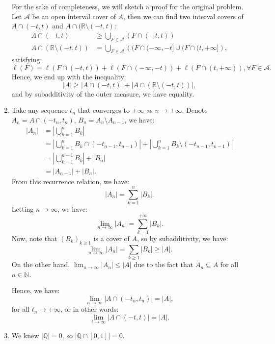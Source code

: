 \begin{enumerate}[label=\textbf{2A.\arabic*}]
    For the sake of completeness, we will sketch a proof for the original
    problem. Let \( \mathcal{A} \) be an open interval cover of \( A \), then we
    can find two interval covers of \( A \cap (-t, t) \) and \( A \cap
    (\mathbb{R} \setminus (-t, t)\):
    \begin{align*}
      A \cap (-t, t) &\ge \bigcup_{F \in \mathcal{A}} (F \cap (-t, t))\\
      A \cap (\mathbb{R} \setminus (-t, t)) &= \bigcup_{F \in \mathcal{A}} \left(
      (F \cap  (-\infty, -t] \cup 
      (F \cap  (t, +\infty]
    \right) 
    ,\end{align*} satisfying:
    \[
      \ell(F) = \ell(F \cap (-t, t)) + \ell(F \cap (-\infty, -t)) + \ell(F \cap
      (t, +\infty)), \forall  F \in \mathcal{A}
    .\] 
    Hence, we end up with the inequality:
    \[
      |A| \ge |A \cap (-t, t)| + |A \cap (\mathbb{R} \setminus (-t, t))|
    ,\] and by subadditivity of the outer measure, we have equality.
  \item \label{2A9}
    Take any sequence \( t_{n} \) that converges to \( +\infty \) as \( n \to
    +\infty \). Denote \( A_{n} = A \cap (-t_{n}, t_{n}) \), \( B_{n} = A_{n} \setminus
    A_{n - 1}\), we have:
    \begin{align*}
      |A_{n}| &=  \left| \bigcup_{k = 1}^{n} B_{k} \right| \\
      &= \left| \bigcup_{k = 1}^{n} B_{k} \cap (-t_{n-1}, t_{n-1}) \right| 
      + \left| \bigcup_{k = 1}^{n} B_{k} \setminus (-t_{n-1}, t_{n-1}) \right|\\
      &= \left|  \bigcup_{k=1}^{n-1} B_{k} \right| + |B_{n}|\\
      &= |A_{n-1}| + |B_{n}|
    .\end{align*}
    From this recurrence relation, we have:
    \[
      |A_{n}| = \sum_{k = 1}^{n} |B_{k}|
    .\] 
    Letting \( n \to \infty \), we have:
    \[
      \lim_{n \to \infty} |A_{n}| = \sum_{k = 1}^{+\infty} |B_{k}|
    .\] 
    Now, note that \( (B_{k})_{k \ge 1} \) is a cover of \( A \), so by
    subadditivity, we have:
    \[
      \lim_{n \to \infty} |A_{n}| = \sum_{k \ge 1} |B_{k}| \ge |A|
    .\] 
    On the other hand, \( \lim_{n \to \infty} |A_{n}| \le |A| \) due to the fact
    that \( A_{n} \subseteq A \) for all \( n \in \mathbb{N} \).

    Hence, we have:
    \[
      \lim_{n \to \infty} |A \cap (-t_{n}, t_{n})| = |A|
    ,\] for all \( t_{n} \to +\infty \), or in other words:
    \[
      \lim_{t \to \infty} |A \cap (-t, t)| = |A|
    .\] 
\item
  We knew \( |\mathbb{Q}| = 0 \), so \( |\mathbb{Q} \cap [0, 1]| = 0 \).


\end{enumerate}
